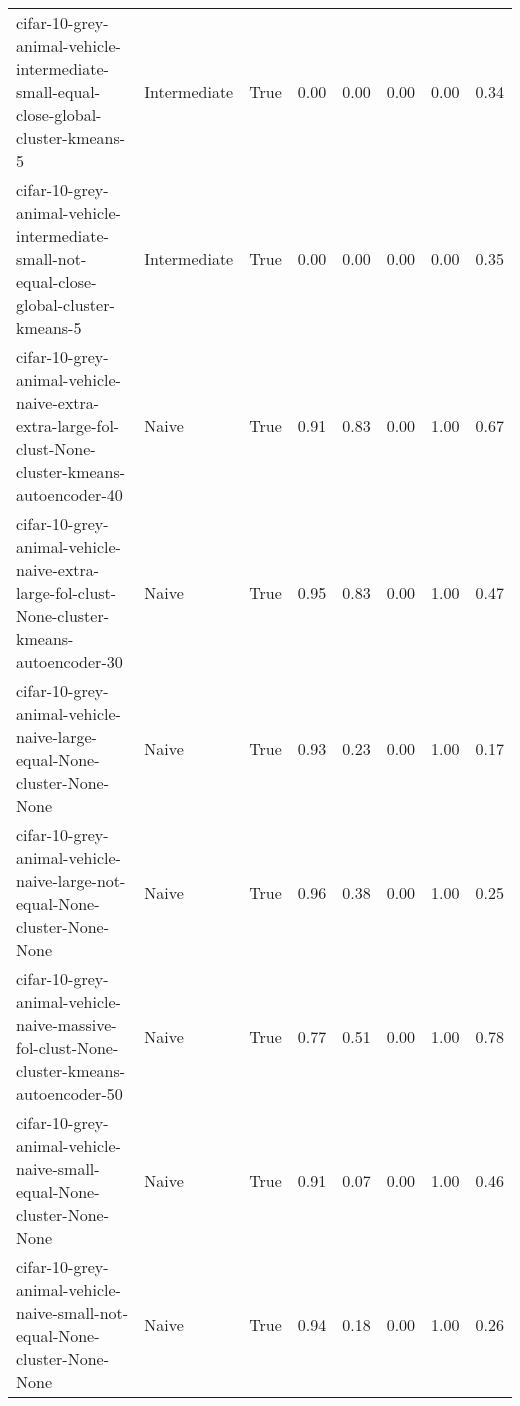 \begin{longtable}{llllllll}
                          cifar-10-grey-animal-vehicle-intermediate-small-equal-close-global-cluster-kmeans-5 & Intermediate &        True &                 0.00 &                 0.00 &                         0.00 &                         0.00 &                         0.34 \\
                      cifar-10-grey-animal-vehicle-intermediate-small-not-equal-close-global-cluster-kmeans-5 & Intermediate &        True &                 0.00 &                 0.00 &                         0.00 &                         0.00 &                         0.35 \\
            cifar-10-grey-animal-vehicle-naive-extra-extra-large-fol-clust-None-cluster-kmeans-autoencoder-40 &        Naive &        True &                 0.91 &                 0.83 &                         0.00 &                         1.00 &                         0.67 \\
                  cifar-10-grey-animal-vehicle-naive-extra-large-fol-clust-None-cluster-kmeans-autoencoder-30 &        Naive &        True &                 0.95 &                 0.83 &                         0.00 &                         1.00 &                         0.47 \\
                                        cifar-10-grey-animal-vehicle-naive-large-equal-None-cluster-None-None &        Naive &        True &                 0.93 &                 0.23 &                         0.00 &                         1.00 &                         0.17 \\
                                    cifar-10-grey-animal-vehicle-naive-large-not-equal-None-cluster-None-None &        Naive &        True &                 0.96 &                 0.38 &                         0.00 &                         1.00 &                         0.25 \\
                      cifar-10-grey-animal-vehicle-naive-massive-fol-clust-None-cluster-kmeans-autoencoder-50 &        Naive &        True &                 0.77 &                 0.51 &                         0.00 &                         1.00 &                         0.78 \\
                                        cifar-10-grey-animal-vehicle-naive-small-equal-None-cluster-None-None &        Naive &        True &                 0.91 &                 0.07 &                         0.00 &                         1.00 &                         0.46 \\
                                    cifar-10-grey-animal-vehicle-naive-small-not-equal-None-cluster-None-None &        Naive &        True &                 0.94 &                 0.18 &                         0.00 &                         1.00 &                         0.26 \\

\end{longtable}
